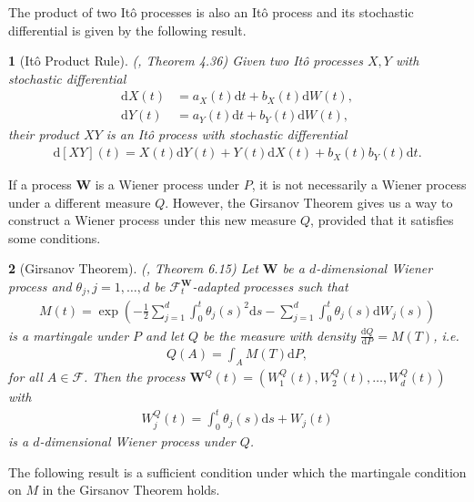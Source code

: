 \documentclass[english]{article}
\numberwithin{equation}{section}
\numberwithin{figure}{section}
\theoremstyle{bolddescit}
\newtheorem{theorem}{\protect\theoremname}[section]
\theoremstyle{definition}
\theoremstyle{definition}
\theoremstyle{plain}
\theoremstyle{plain}
\theoremstyle{bolddesc}
\theoremstyle{plain}
\theoremstyle{remark}
\providecommand{\theoremname}{Theorem}
\begin{document}
The product of two It\^o processes is also an It\^o process and its stochastic differential is given by the following result.

\begin{theorem}[It\^o Product Rule]\label{thm:ito-product-rule}
  (\cite{capinski_stochastic_2012}, Theorem 4.36)
  Given two It\^o processes $X, Y$ with stochastic differential
  \begin{align*}
    \mathrm{d}X(t) &= a_X(t) \mathrm{d}t + b_X(t) \mathrm{d}W(t),\\
    \mathrm{d}Y(t) &= a_Y(t) \mathrm{d}t + b_Y(t) \mathrm{d}W(t),
  \end{align*}
  their product $XY$ is an It\^o process with stochastic differential
  \begin{align*}
    \mathrm{d}[XY](t) = X(t) \mathrm{d}Y(t) + Y(t) \mathrm{d}X(t) + b_X(t) b_Y(t) \mathrm{d}t.
  \end{align*}
\end{theorem}

If a process $\mathbf{W}$ is a Wiener process under $P$, it is not necessarily a Wiener process under a different measure $Q$. However, the Girsanov Theorem gives us a way to construct a Wiener process under this new measure $Q$, provided that it satisfies some conditions.

\begin{theorem}[Girsanov Theorem]\label{thm:girsanov}
  (\cite{capinski_blackscholes_2012}, Theorem 6.15)
  Let $\mathbf{W}$ be a $d$-dimensional Wiener process and $\theta_j, j=1,\ldots,d$ be $\mathcal{F}^\mathbf{W}_t$-adapted processes such that
  \begin{align*}
    M(t) = \exp \left( - \frac{1}{2} \sum_{j=1}^d \int_0^t \theta_j(s)^2 \mathrm{d}s - \sum_{j=1}^d \int_0^t \theta_j(s) \mathrm{d}W_j(s) \right)
  \end{align*}
  is a martingale under $P$ and let $Q$ be the measure with density $\frac{\mathrm{d}Q}{\mathrm{d}P} = M(T)$, i.e.
  \begin{align*}
    Q(A) = \int_A M(T) \mathrm{d}P,
  \end{align*}
  for all $A \in \mathcal{F}$.
  Then the process $\mathbf{W}^Q(t) = (W^Q_1(t), W^Q_2(t), \ldots, W^Q_d(t))$ with
  \begin{align*}
    W^Q_j(t) = \int_0^t \theta_j(s) \mathrm{d}s + W_j(t)
  \end{align*}
  is a $d$-dimensional Wiener process under $Q$.
\end{theorem}

The following result is a sufficient condition under which the martingale condition on $M$ in the Girsanov Theorem holds.
\end{document}
